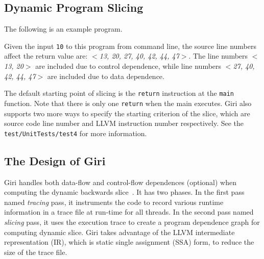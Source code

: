 \documentclass[DIV=calc, paper=a4, fontsize=11pt, twocolumn]{scrartcl}
\begin{document}
\subsection{Dynamic Program Slicing}
The following is an example program.

Given the input \texttt{10} to this program from command line,
the source line numbers affect the return value are: $<$\emph{13, 20, 27, 40, 42, 44, 47}$>$.
The line numbers $<$\emph{13, 20}$>$ are included due to control dependence,
while line numbers $<$\emph{27, 40, 42, 44, 47}$>$ are included due to data dependence.

The default starting point of slicing is the \texttt{return} instruction at the \texttt{main} function.
Note that there is only one \texttt{return} when the main executes.
Giri also supports two more ways to specify the starting criterion of the slice,
which are source code line number and LLVM instruction number respectively.
See the \texttt{test/UnitTests/test4} for more information.

\subsection{The Design of Giri}
Giri handles both data-flow and control-flow dependences (optional) when computing the dynamic backwards slice~\cite{sahoo2013asplos}.
It has two phases.
In the first pass named \emph{tracing} pass, it instruments the code to record various runtime information in a trace file at run-time for all threads.
In the second pass named \emph{slicing} pass, it uses the execution trace to create a program dependence graph for computing dynamic slice.
Giri takes advantage of the LLVM intermediate representation (IR), which is static single assignment (SSA) form, to reduce the size of the trace file. 
\end{document}
